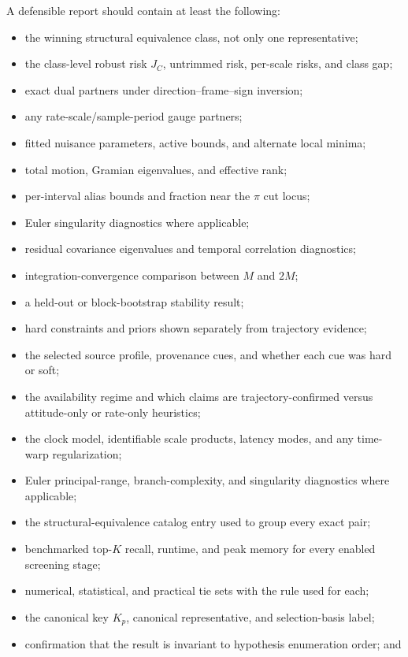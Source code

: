 \documentclass[11pt]{article}
\begin{document}
    A defensible report should contain at least the following:
    \begin{itemize}[nosep]
    \item the winning structural equivalence class, not only one representative;
    \item the class-level robust risk $J_C$, untrimmed risk, per-scale risks, and class gap;
    \item exact dual partners under direction--frame--sign inversion;
    \item any rate-scale/sample-period gauge partners;
    \item fitted nuisance parameters, active bounds, and alternate local minima;
    \item total motion, Gramian eigenvalues, and effective rank;
    \item per-interval alias bounds and fraction near the $\pi$ cut locus;
    \item Euler singularity diagnostics where applicable;
    \item residual covariance eigenvalues and temporal correlation diagnostics;
    \item integration-convergence comparison between $M$ and $2M$;
    \item a held-out or block-bootstrap stability result;
    \item hard constraints and priors shown separately from trajectory evidence;
    \item the selected source profile, provenance cues, and whether each cue was hard or soft;
    \item the availability regime and which claims are trajectory-confirmed versus attitude-only or rate-only heuristics;
    \item the clock model, identifiable scale products, latency modes, and any time-warp regularization;
    \item Euler principal-range, branch-complexity, and singularity diagnostics where applicable;
    \item the structural-equivalence catalog entry used to group every exact pair;
    \item benchmarked top-$K$ recall, runtime, and peak memory for every enabled screening stage;
    \item numerical, statistical, and practical tie sets with the rule used for each;
    \item the canonical key $K_p$, canonical representative, and selection-basis label;
    \item confirmation that the result is invariant to hypothesis enumeration order; and

\end{itemize}
\end{document}

